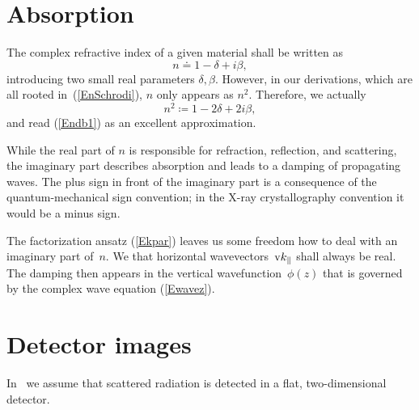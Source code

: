 
%

\section{Absorption}\label{Sabsorption}

%
%
The complex refractive index of a given material
shall be written as
\begin{equation}\label{Endb1}
  n\doteq 1-\delta +i\beta,  
\end{equation}
%
%
introducing two small real parameters $\delta, \beta$.
However, 
in our derivations, which are all rooted in~(\ref{EnSchrodi}),
$n$ only appears as $n^2$. 
Therefore, we actually 
\begin{equation}\label{Endb2}
  n^2\coloneqq 1-2\delta+2i\beta,
\end{equation}
and read (\ref{Endb1}) as an excellent approximation.

While the real part of $n$ is responsible for refraction, reflection,
and scattering,
the imaginary part describes absorption
and leads to a damping of propagating waves.
The plus sign in front of the imaginary part is a consequence of
the quantum-mechanical sign convention;
in the X-ray crystallography convention it would be a minus sign.
%

The factorization ansatz (\ref{Ekpar}) leaves us some freedom
how to deal with an imaginary part of~$n$.
We  that horizontal wavevectors~$\text{v}{k}_\parallel$
shall always be real.
The damping then appears in the vertical wavefunction~$\phi(z)$
that is governed by the complex wave equation (\ref{Ewavez}).

%

\section{Detector images}\label{Sdetimg}


In \BornAgain\ we assume that
scattered radiation is detected in a flat, two-dimensional detector.


